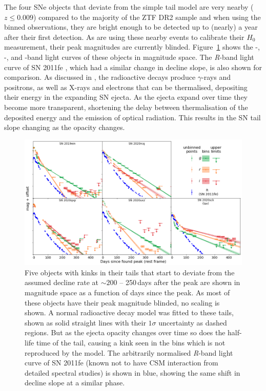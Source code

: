 \documentclass[a4paper,oneside,12pt, class=Latex/Classes/PhDthesisPSnPDF, crop=false]{standalone}
\begin{document}
The four SNe objects that deviate from the simple tail model are very nearby ($z \leq 0.009$) compared to the majority of the ZTF DR2 sample and when using the binned observations, they are bright enough to be detected up to (nearly) a year after their first detection. As \citet{DR2_Overview} are using these nearby events to calibrate their $H_0$ measurement, their peak magnitudes are currently blinded. Figure~\ref{kink_plots} shows the \ztfg-, \ztfr-, and \ztfi-band light curves of these objects in magnitude space. The \textit{R}-band light curve of SN 2011fe \citep{spec_Lijiang-2.4m}, which had a similar change in decline slope, is also shown for comparison. As discussed in \citet{Georgios_11fe}, the radioactive decays produce $\gamma$-rays and positrons, as well as X-rays and electrons that can be thermalised, depositing their energy in the expanding SN ejecta. As the ejecta expand over time they become more transparent, shortening the delay between thermalisation of the deposited energy and the emission of optical radiation. This results in the SN tail slope changing as the opacity changes.

\begin{figure}
 \centering
 \includegraphics[width=\textwidth]{../Images/chapter_3/kinktails_plots.png}
 \caption{Five objects with kinks in their tails that start to deviate from the assumed decline rate at $\sim200$ -- 250\,days after the peak are shown in magnitude space as a function of days since the peak. As most of these objects have their peak magnitude blinded, no scaling is shown. A normal radioactive decay model was fitted to these tails, shown as solid straight lines with their $1\sigma$ uncertainty as dashed regions. But as the ejecta opacity changes over time so does the half-life time of the tail, causing a kink seen in the bins which is not reproduced by the model. The arbitrarily normalised \textit{R}-band light curve of SN 2011fe (known not to have CSM interaction from detailed spectral studies) \citep{spec_Lijiang-2.4m} is shown in blue, showing the same shift in decline slope at a similar phase.}
 \label{kink_plots}
\end{figure}
\end{document}
